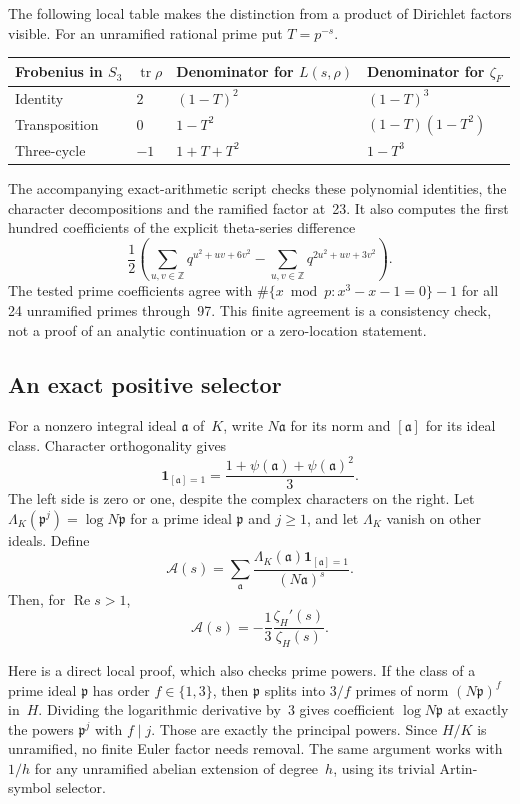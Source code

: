 \documentclass[11pt,letterpaper]{article}
\theoremstyle{definition}\newtheorem{definition}[theorem]{Definition}
\theoremstyle{remark}\newtheorem{remark}[theorem]{Remark}
\newcommand{\Z}{\mathbb Z}\newcommand{\N}{\mathbb N}
\newcommand{\re}{\operatorname{Re}}\newcommand{\im}{\operatorname{Im}}
\newcommand{\one}{\mathbf 1}\newcommand{\code}[1]{\texttt{\small #1}}
\begin{document}
The following local table makes the distinction from a product of Dirichlet factors visible.
For an unramified rational prime put $T=p^{-s}$.
\begin{center}\small
\begin{tabular}{llll}
\toprule
Frobenius in $S_3$ & $\operatorname{tr}\rho$ & Denominator for $L(s,\rho)$ & Denominator for $\zeta_F$\\
\midrule
Identity & $2$ & $(1-T)^2$ & $(1-T)^3$\\
Transposition & $0$ & $1-T^2$ & $(1-T)(1-T^2)$\\
Three-cycle & $-1$ & $1+T+T^2$ & $1-T^3$\\
\bottomrule
\end{tabular}
\end{center}
The accompanying exact-arithmetic script checks these polynomial identities, the character
decompositions and the ramified factor at~23. It also computes the first hundred coefficients
of the explicit theta-series difference
\[
 \frac12\left(\sum_{u,v\in\Z}q^{u^2+uv+6v^2}
                 -\sum_{u,v\in\Z}q^{2u^2+uv+3v^2}\right).
\]
The tested prime coefficients agree with
$\#\{x\bmod p:x^3-x-1=0\}-1$ for all 24 unramified primes through~97.
This finite agreement is a consistency check, not a proof of an analytic continuation
or a zero-location statement.

\subsection{An exact positive selector}
For a nonzero integral ideal $\mathfrak a$ of~$K$, write $N\mathfrak a$ for its norm and
$[\mathfrak a]$ for its ideal class. Character orthogonality gives
\begin{equation}\label{eq:selector}
 \one_{[\mathfrak a]=1}
 =\frac{1+\psi(\mathfrak a)+\psi(\mathfrak a)^2}{3}.
\end{equation}
The left side is zero or one, despite the complex characters on the right.
Let $\Lambda_K(\mathfrak p^j)=\log N\mathfrak p$ for a prime ideal $\mathfrak p$ and
$j\ge1$, and let $\Lambda_K$ vanish on other ideals. Define
\[
 \mathcal A(s)=\sum_{\mathfrak a}
 \frac{\Lambda_K(\mathfrak a)\one_{[\mathfrak a]=1}}{(N\mathfrak a)^s}.
\]
Then, for $\re s>1$,
\begin{equation}\label{eq:logderivative}
 \mathcal A(s)=-\frac13\frac{\zeta_H'(s)}{\zeta_H(s)}.
\end{equation}

Here is a direct local proof, which also checks prime powers. If the class of a prime ideal
$\mathfrak p$ has order $f\in\{1,3\}$, then $\mathfrak p$ splits into $3/f$ primes of
norm $(N\mathfrak p)^f$ in~$H$. Dividing the logarithmic derivative by~3 gives
coefficient $\log N\mathfrak p$ at exactly the powers $\mathfrak p^j$ with $f\mid j$.
Those are exactly the principal powers. Since $H/K$ is unramified, no finite Euler factor
needs removal. The same argument works with $1/h$ for any unramified abelian extension
of degree~$h$, using its trivial Artin-symbol selector.
\end{document}
